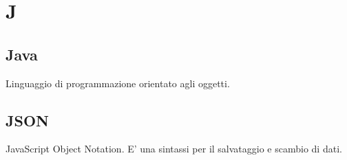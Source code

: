 \section*{J}
\subsection*{Java
 }
Linguaggio di programmazione orientato agli oggetti.


\subsection*{JSON}
JavaScript Object Notation. E’ una sintassi per il salvataggio e scambio di dati. 















